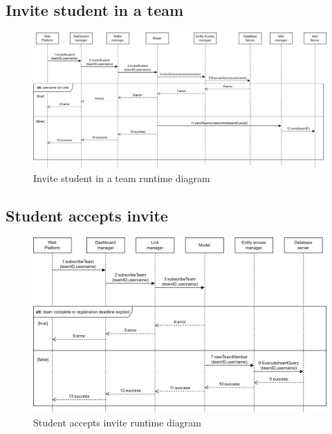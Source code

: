\subsection*{Invite student in a team}
\begin{figure}[h]
    \centering
    \includegraphics[width=\textwidth]{images/runtime/inviteS.png}
    \caption{Invite student in a team runtime diagram}
    \label{fig:rt-inviteS}
\end{figure}
\clearpage

\subsection*{Student accepts invite}
\begin{figure}[h]
    \centering
    \includegraphics[width=\textwidth]{images/runtime/acceptS.png}
    \caption{Student accepts invite runtime diagram}
    \label{fig:rt-acceptS}
\end{figure}
\clearpage

